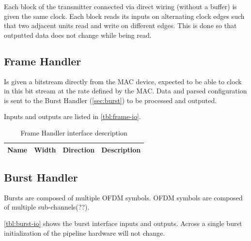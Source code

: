 \documentclass[dvips,10pt,twocolumn]{article}
\begin{document}
Each block of the transmitter connected via direct wiring (without a
buffer) is given the same clock. Each block reads its inputs on alternating
clock edges such that two adjacent units read and write on different edges.
This is done so that outputted data does not change while being read.

\subsection{Frame Handler}

Is given a bitstream directly from the MAC device, expected to be able to
clock in this bit stream at the rate defined by the MAC. Data and
parsed configuration is sent to the Burst Handler (\autoref{sec:burst})
to be processed and outputed.

Inputs and outputs are listed in \autoref{tbl:frame-io}.

\begin{table} \begin{tabularx}{\textwidth}{c|c|c|X} \label{frame-io}
	Name & Width & Direction & Description \\ \hline
\end{tabularx} \caption{Frame Handler interface description} \end{table}

\subsection{Burst Handler} \label{sec:burst}
Bursts are composed of multiple OFDM symbols. OFDM symbols are composed of
multiple sub-channels(??). 

\autoref{tbl:burst-io} shows the burst interface inputs and outputs.
Across a single burst initialization of the pipeline hardware will not
change.
\end{document}
